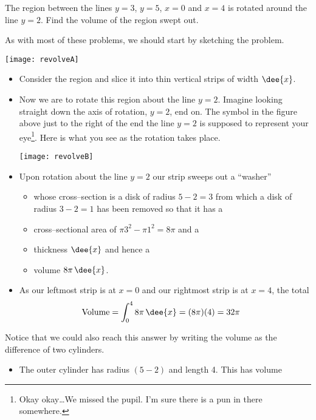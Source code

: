 \begin{eg}\label{eg:VOLe}
The region between the lines $y=3$, $y=5$, $x=0$ and $x=4$
is rotated around the line $y=2$. Find the volume of the region
swept out.

\soln As with most of these problems, we should start by sketching the problem.
\begin{efig}
\begin{center}
   \texttt{[image: revolveA]}
\end{center}
\end{efig}
\begin{itemize}
 \item Consider the region and slice it into thin vertical strips of width
$\dee{x}$.
\item  Now we are to rotate this region about the line $y=2$. Imagine looking
straight down the axis of rotation, $y=2$, end on. The symbol in the figure
above just to the right of the end the line $y=2$ is supposed to represent your
eye\footnote{Okay okay\dots We missed the pupil. I'm sure there is a pun in
there somewhere.}. Here is what you see as the rotation takes place.
\begin{efig}
\begin{center}
   \texttt{[image: revolveB]}
\end{center}
\end{efig}
\item Upon rotation about the line $y=2$ our strip sweeps out a ``washer''
\begin{itemize}
\item
whose cross--section is a disk of radius $5-2=3$ from which
a disk of radius $3-2=1$ has been removed so that it has a
\item
cross--sectional area of $\pi 3^2 -\pi 1^2 = 8\pi$ and a
\item
thickness $\dee{x}$ and hence a
\item
volume $8\pi\,\dee{x}$.
\end{itemize}
\item As our leftmost strip is at $x=0$ and our rightmost strip is
at $x=4$, the total
\begin{align*}
\text{Volume}
&= \int _0^4 8\pi\,\dee{x}
=(8\pi)(4)
=32\pi
\end{align*}
\end{itemize}
Notice that we could also reach this answer by writing the volume as the
difference of two cylinders.
\begin{itemize}
 \item The outer cylinder has radius $(5-2)$ and length 4. This has volume

\end{itemize}
\end{eg}
